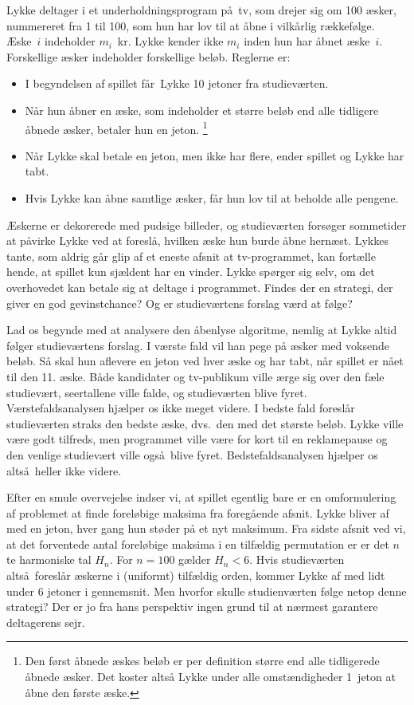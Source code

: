 Lykke deltager i et underholdningsprogram på tv, som drejer sig om 100 æsker, nummereret fra 1 til 100, som hun har lov til at åbne i vilkårlig rækkefølge.
Æske~$i$ indeholder $m_i$~kr.
Lykke kender ikke $m_i$ inden hun har åbnet æske~$i$.
Forskellige æsker indeholder forskellige beløb.
Reglerne er:
\begin{itemize}
\item I begyndelsen af spillet får Lykke 10 jetoner fra studieværten.
\item Når hun åbner en æske, som indeholder et større beløb end alle tidligere åbnede æsker, betaler hun en jeton.
\footnote{Den først åbnede æskes beløb er per definition større end alle tidligerede åbnede æsker. 
    Det koster altså Lykke under alle omstændigheder 1~jeton at åbne den første æske.}
\item Når Lykke skal betale en jeton, men ikke har flere, ender spillet og Lykke har tabt.
\item Hvis Lykke kan åbne samtlige æsker, får hun lov til at beholde alle pengene.
\end{itemize}
Æskerne er dekorerede med pudsige billeder, og studieværten forsøger sommetider at påvirke Lykke ved at foreslå, hvilken æske hun burde åbne hernæst.
Lykkes tante, som aldrig går glip af et eneste afsnit at tv-programmet, kan fortælle hende, at spillet kun sjældent har en vinder.
Lykke spørger sig selv, om det overhovedet kan betale sig at deltage i programmet.
Findes der en strategi, der giver en god gevinstchance?
Og er studieværtens forslag værd at følge?

Lad os begynde med at analysere den åbenlyse algoritme, nemlig at Lykke altid følger studieværtens forslag.
I værste fald vil han pege på æsker med voksende beløb.
Så skal hun aflevere en jeton ved hver æske og har tabt, når spillet er nået til den 11. æske.
Både kandidater og tv-publikum ville ærge sig over den fæle studievært, seertallene ville falde, og studieværten blive fyret.
Værstefaldsanalysen hjælper os ikke meget videre.
I bedste fald foreslår studieværten straks den bedste æske, dvs.\ den med det største beløb.
Lykke ville være godt tilfreds, men programmet ville være for kort til en reklamepause og den venlige studievært ville også blive fyret.
Bedstefaldsanalysen hjælper os altså heller ikke videre.

Efter en smule overvejelse indser vi, at spillet egentlig bare er en omformulering af problemet at finde foreløbige maksima fra foregående afsnit.
Lykke bliver af med en jeton, hver gang hun støder på et nyt maksimum.
Fra sidste afsnit ved vi, at det forventede antal foreløbige maksima i en tilfældig permutation er
er det  $n$te harmoniske tal $H_n$.%
For $n = 100$ gælder $H_n < 6$. 
Hvis studieværten altså foreslår æskerne i (uniformt) tilfældig orden, kommer Lykke af med lidt under 6 jetoner i gennemsnit. 
Men hvorfor skulle studienværten følge netop denne strategi?
Der er jo fra hans perspektiv ingen grund til at nærmest garantere deltagerens sejr.

